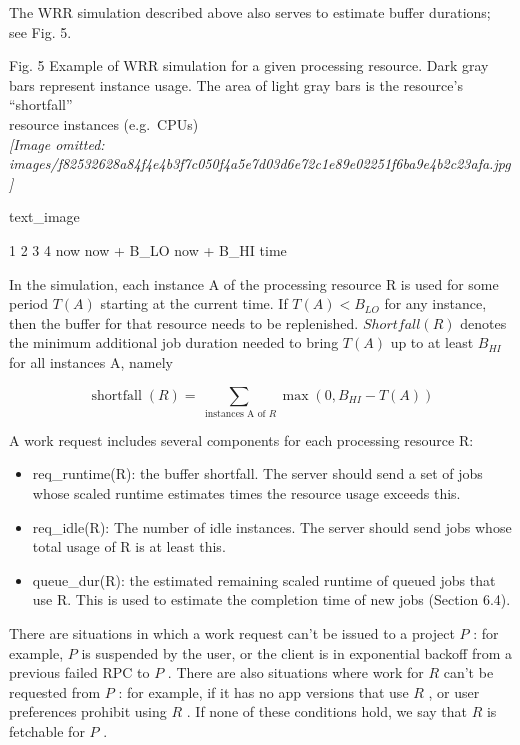 \documentclass[
]{article}
\providecommand{\tightlist}{%
  \setlength{\itemsep}{0pt}\setlength{\parskip}{0pt}}
\begin{document}
The WRR simulation described above also serves to estimate buffer
durations; see Fig. 5.

Fig. 5 Example of WRR simulation for a given processing resource. Dark
gray bars represent instance usage. The area of light gray bars is the
resource's ``shortfall''\\
resource instances (e.g.~CPUs)\\
\textit{[Image omitted: images/f82532628a84f4e4b3f7c050f4a5e7d03d6e72c1e89e02251f6ba9e4b2c23afa.jpg]}

text\_image

1 2 3 4 now now + B\_LO now + B\_HI time

In the simulation, each instance A of the processing resource R is used
for some period \(T(A)\) starting at the current time. If
\(T(A) < B_{LO}\) for any instance, then the buffer for that resource
needs to be replenished. \(Shortfall(R)\) denotes the minimum additional
job duration needed to bring \(T(A)\) up to at least \(B_{HI}\) for all
instances A, namely

\[
\operatorname{shortfall} (R) = \sum_ {\text { instances   A   of   } R} \max (0, B _ {H I} - T (A))
\]

A work request includes several components for each processing resource
R:

\begin{itemize}
\tightlist
\item
  req\_runtime(R): the buffer shortfall. The server should send a set of
  jobs whose scaled runtime estimates times the resource usage exceeds
  this.\\
\item
  req\_idle(R): The number of idle instances. The server should send
  jobs whose total usage of R is at least this.\\
\item
  queue\_dur(R): the estimated remaining scaled runtime of queued jobs
  that use R. This is used to estimate the completion time of new jobs
  (Section 6.4).
\end{itemize}

There are situations in which a work request can't be issued to a
project \(P\) : for example, \(P\) is suspended by the user, or the
client is in exponential backoff from a previous failed RPC to \(P\) .
There are also situations where work for \(R\) can't be requested from
\(P\) : for example, if it has no app versions that use \(R\) , or user
preferences prohibit using \(R\) . If none of these conditions hold, we
say that \(R\) is fetchable for \(P\) .
\end{document}
